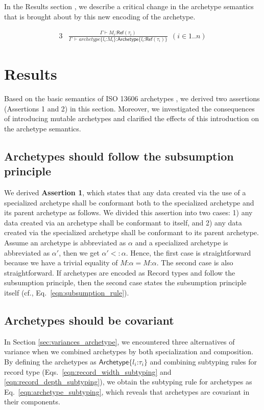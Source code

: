 \documentclass[preprint,3p,onecolumn,times,review]{article}
\begin{document}
{In the Results section , we describe a critical change in the archetype semantics that is brought about by this new encoding of the archetype.

\begin{alignat}{3}
  & \frac{\Gamma \vdash M_i \text{:} \mathsf{Ref}(\tau_i) }
         {\Gamma ~ \vdash archetype\{l_i\text{:} M_i\} \text{:} \mathsf{Archetype}\{l_i \text{:} \mathsf{Ref}(\tau_i) \} } ~~ (i \in 1..n) \label{eqn:mutable_record_field_reference}
\end{alignat}


\section{Results}


Based on the basic semantics of ISO 13606 archetypes , we derived two assertions (Assertions 1 and 2) in this section.
Moreover, we investigated the consequences of introducing mutable archetypes and clarified the effects of this introduction on the archetype semantics.

\subsection{Archetypes should follow the subsumption principle}

We derived {\bf Assertion 1}, which states that any data created via the use of a specialized archetype shall be conformant both to the specialized archetype and its parent archetype as follows.
We divided this assertion into two cases: 1) any data created via an archetype shall be conformant to itself, and 2) any data created via the specialized archetype shall be conformant to its parent archetype.
Assume an archetype is abbreviated as $\alpha$ and a specialized archetype is abbreviated as $\alpha'$, then we get  $\alpha' <: \alpha$.
Hence, the first case is straightforward because we have a trivial equality of $M \text{:} \alpha = M \text{:} \alpha$.
The second case is also straightforward. If archetypes are encoded as Record types and follow the subsumption principle, then the second case states the subsumption principle itself (cf., Eq.~\ref{eqn:subsumption_rule}).


\subsection{Archetypes should be covariant}

In Section \ref{sec:variances_archetype}, we encountered three alternatives of variance when we combined archetypes by both specialization and composition.
By defining the archetypes as $\mathsf{Archetype}\{l_i \text{:} \tau_i \}$ and combining subtyping rules for record type (Eqs.~\ref{eqn:record_width_subtyping} and \ref{eqn:record_depth_subtyping}), we obtain the subtyping rule for archetypes as Eq.~\ref{eqn:archetype_subtyping}, which reveals that archetypes are covariant in their components.

}
\end{document}

